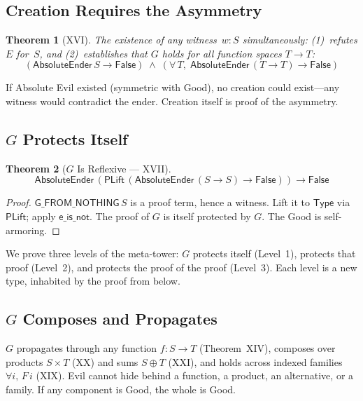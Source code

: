 \documentclass[12pt,a4paper]{article}
\newtheorem{theorem}{Theorem}[section]
\begin{document}
\subsection{Creation Requires the Asymmetry}

\begin{theorem}[XVI]
The existence of any witness~$w : S$ simultaneously:
(1)~refutes $E$ for~$S$, and (2)~establishes that $G$ holds
for all function spaces $T \to T$:
\[ (\mathsf{AbsoluteEnder}\,S \to \mathsf{False}) \;\land\;
   (\forall\, T,\; \mathsf{AbsoluteEnder}\,(T \to T) \to \mathsf{False}) \]
\end{theorem}

If Absolute Evil existed (symmetric with Good), no creation could
exist---any witness would contradict the ender. Creation itself is
proof of the asymmetry.

\subsection{$G$ Protects Itself}

\begin{theorem}[$G$ Is Reflexive --- XVII]
\[ \mathsf{AbsoluteEnder}\,(\mathsf{PLift}\,(\mathsf{AbsoluteEnder}\,(S \to S) \to \mathsf{False})) \to \mathsf{False} \]
\end{theorem}

\begin{proof}
$\mathsf{G\_FROM\_NOTHING}\,S$ is a proof term, hence a witness.
Lift it to $\mathsf{Type}$ via $\mathsf{PLift}$; apply $\mathsf{e\_is\_not}$.
The proof of $G$ is itself protected by $G$. The Good is self-armoring.
\end{proof}

We prove three levels of the meta-tower:
$G$ protects itself (Level~1), protects that proof (Level~2),
and protects the proof of the proof (Level~3). Each level is a new
type, inhabited by the proof from below.

\subsection{$G$ Composes and Propagates}

$G$ propagates through any function $f : S \to T$ (Theorem~XIV),
composes over products $S \times T$ (XX) and sums $S \oplus T$ (XXI),
and holds across indexed families $\forall i,\, F\,i$ (XIX).
Evil cannot hide behind a function, a product, an alternative,
or a family. If any component is Good, the whole is Good.
\end{document}
